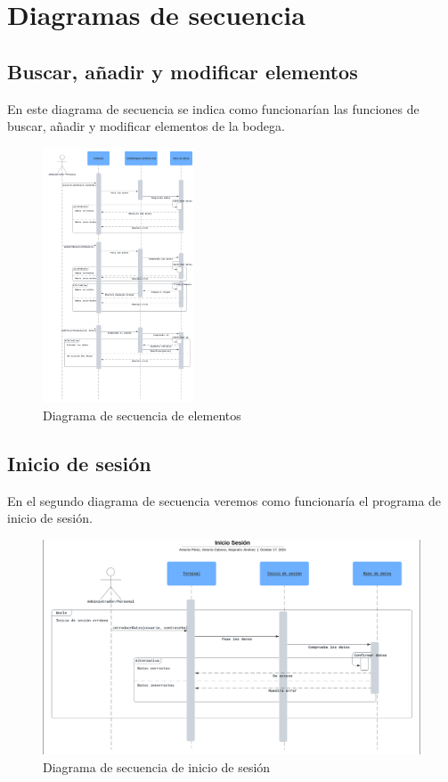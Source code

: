 \chapter{Diagramas de secuencia}

\section{Buscar, añadir y modificar elementos}

En este diagrama de secuencia se indica como funcionarían las funciones de buscar, añadir y modificar elementos de la bodega. 

\begin{figure}[h]
    \centering
    \includegraphics[width=0.4\textwidth]{figures/elementos-secuencia.png}
    \caption{Diagrama de secuencia de elementos}
    \label{fig:elementos}
\end{figure}

\section{Inicio de sesión}

En el segundo diagrama de secuencia veremos como funcionaría el programa de inicio de sesión.

\begin{figure}[h]
    \centering
    \includegraphics[width=1\textwidth]{figures/inicio-sesion-secuencia.png}
    \caption{Diagrama de secuencia de inicio de sesión}
    \label{fig:login}
\end{figure}

